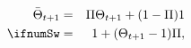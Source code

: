 \begin{eqnarray}
  \bar{\Theta}_{t+1} & = & \Pi \Theta_{t+1} + (1-\Pi)1
\\ \ifnumSw & = & 1 + (\Theta_{t+1}-1)\Pi ,  \label{eq:barTheta}
\end{eqnarray}
